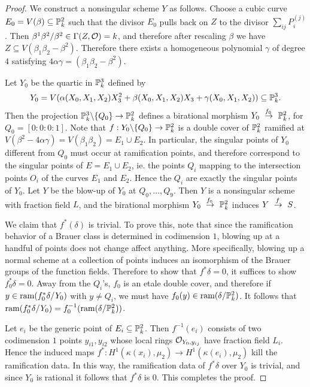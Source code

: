\begin{proof}
We construct a nonsingular scheme $Y$ as follows.  Choose a cubic curve $E_0 = V(\beta)\subseteq \mathbb{P}^2_k$ such that the divisor $E_0$ pulls back on $Z$ to the divisor $\sum_{ij}P_i^{(j)}$.  Then $\beta^1\beta^2/\beta^2\in \Gamma(Z,\mathcal{O}) = k$, and therefore after rescaling $\beta$ we have $Z\subseteq V(\beta_1\beta_2-\beta^2)$.  Therefore there exists a homogeneous polynomial $\gamma$ of degree $4$ satisfying $4\alpha\gamma = (\beta_1\beta_2-\beta^2)$.

Let $Y_0$ be the quartic in $\mathbb{P}^3_k$ defined by
$$Y_0 = V(\alpha(X_0,X_1,X_2)X_3^2 + \beta(X_0,X_1,X_2)X_3 + \gamma(X_0,X_1,X_2))\subseteq \mathbb{P}^3_k.$$
Then the projection $\mathbb{P}^3_k\backslash\{Q_0\}\rightarrow\mathbb{P}^2_k$ defines a birational morphism $Y_0\xdashrightarrow{f_0}\bbp^2_k$, for $Q_0 = [0:0:0:1]$.  Note that $f: Y_0\backslash\{Q_0\}\rightarrow\mathbb{P}^2_k$ is a double cover of $\mathbb{P}^2_k$ ramified at $V(\beta^2-4\alpha\gamma) = V(\beta_1\beta_2) = E_1\cup E_2$.  In particular, the singular points of $Y_0$ different from $Q_0$ must occur at ramification points, and therefore correspond to the singular points of $E = E_1\cup E_2$, ie. the points $Q_i$ mapping to the intersection points $O_i$ of the curves $E_1$ and $E_2$.  Hence the $Q_i$ are exactly the singular points of $Y_0$.  Let $Y$ be the blow-up of $Y_0$ at $Q_0,\dots, Q_9$.  Then $Y$ is a nonsingular scheme with fraction field $L$, and the birational morphism $Y_0\xdashrightarrow{f_0} \bbp^2_k$ induces $Y\xdashrightarrow{f} S$.

We claim that $f^*(\delta)$ is trivial.  To prove this, note that since the ramification behavior of a Brauer class is determined in codimension $1$, blowing up at a handful of points does not change affect anything.  More specifically, blowing up a normal scheme at a collection of points induces an isomorphism of the Brauer groups of the function fields.  Therefore to show that $f^*\delta=0$, it suffices to show $f_0^*\delta=0$.  Away from the $Q_i$'s, $f_0$ is an etale double cover, and therefore if $y\in \textnormal{ram}(f_0^*\delta/Y_0)$ with $y\neq Q_i$, we must have $f_0(y)\in\textnormal{ram}(\delta/\mathbb{P}^2_k)$.  It follows that $\textnormal{ram}(f_0^*\delta/Y_0) = f_0^{-1}(\textnormal{ram}(\delta/\mathbb{P}^2_k))$.

Let $e_i$ be the generic point of $E_i\subseteq\mathbb{P}^2_k$.  Then $f^{-1}(e_i)$ consists of two codimension $1$ points $y_{i1},y_{i2}$ whose local rings $\mathcal{O}_{Y_0,y_{ij}}$ have fraction field $L_i$.  Hence the induced maps $f^*: H^1(\kappa(x_i),\mu_2)\rightarrow H^1(\kappa(e_i),\mu_2)$ kill the ramification data.  In this way, the ramification data of $f^*\delta$ over $Y_0$ is trivial, and since $Y_0$ is rational it follows that $f^*\delta$ is $0$.  This completes the proof.
\end{proof}

